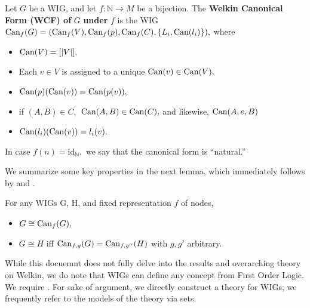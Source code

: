 \begin{itemize}

\begin{definition}
  Let $G$ be a WIG, and let $f: \mathbb{N} \to M$ be a bijection. The \textbf{Welkin Canonical Form (WCF) of} $G$ \textbf{under} $f$ is the WIG $\textrm{Can}_{f}(G) = (\textrm{Can}_{f}(V), \textrm{Can}_{f}(p), \textrm{Can}_{f}(C), \{L_{i}, \textrm{Can}(l_{i})\}),$
  where
  \begin{itemize}
    \item $\textrm{Can}(V) = [|V|],$
    \item Each $v \in V$ is assigned to a unique $\textrm{Can}(v) \in \textrm{Can}(V),$
    \item $\textrm{Can}(p)(\textrm{Can}(v)) = \textrm{Can}(p(v)),$
    \item if $(A, B) \in C,$ $\textrm{Can}(A, B) \in \textrm{Can}(C),$ and likewise, $\textrm{Can}(A, e, B) $
    \item $\textrm{Can}(l_{i})(\textrm{Can}(v)) = l_{i}(v).$
  \end{itemize}
In case $f(n) = \mathrm{id_{\mathbb{N}}},$ we say that the canonical form is ``natural.''
\end{definition}
\label{def:iso}

We summarize some key properties in the next lemma, which immediately follows by \label{def:iso} and \label{lemma:closure}.

\begin{lemma}
  For any WIGs G, H, and fixed representation $f$ of nodes,
  \begin{itemize}
    \item $G \cong \textrm{Can}_{f}(G),$
    \item $G \cong H$ iff $\textrm{Can}_{f, g}(G) = \textrm{Can}_{f, g''}(H)$ with $g, g'$ arbitrary.
  \end{itemize}
\end{lemma}

While this docuemnt does not fully delve into the results and overarching theory on Welkin, we do note that WIGs can define any concept from First Order Logic. We require . For sake of argument, we directly construct a theory for WIGs; we frequently refer to the models of the theory via sets.


\end{itemize}
